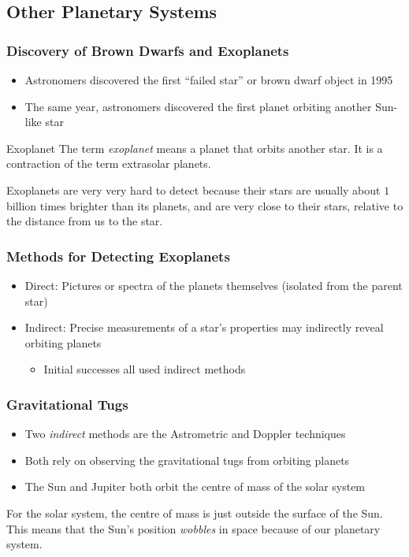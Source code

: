 \documentclass[class=article, crop=false]{standalone}
\begin{document}
  \subsection{Other Planetary Systems}
  \subsubsection{Discovery of Brown Dwarfs and Exoplanets}
  \begin{itemize}
    \item Astronomers discovered the first ``failed star'' or brown dwarf object in 1995
    \item The same year, astronomers discovered the first planet orbiting another Sun-like star
  \end{itemize}
  \begin{definition}{Exoplanet}
    The term \emph{exoplanet} means a planet that orbits another star. It is a contraction of the term extrasolar planets.
  \end{definition}
  Exoplanets are very very hard to detect because their stars are usually about $1$ billion times brighter than its planets, and are very close to their stars, relative to the distance from us to the star.
  \subsubsection{Methods for Detecting Exoplanets}
  \begin{itemize}
    \item Direct: Pictures or spectra of the planets themselves (isolated from the parent star)
    \item Indirect: Precise measurements of a star's properties may indirectly reveal orbiting planets
    \begin{itemize}
      \item Initial successes all used indirect methods
    \end{itemize}
  \end{itemize}
  \subsubsection{Gravitational Tugs}
  \begin{itemize}
    \item Two \emph{indirect} methods are the Astrometric and Doppler techniques
    \item Both rely on observing the gravitational tugs from orbiting planets
    \item The Sun and Jupiter both orbit the centre of mass of the solar system
  \end{itemize}
  \begin{note}{}
    For the solar system, the centre of mass is just outside the surface of the Sun. This means that the Sun's position \emph{wobbles} in space because of our planetary system.
  \end{note}
\end{document}
